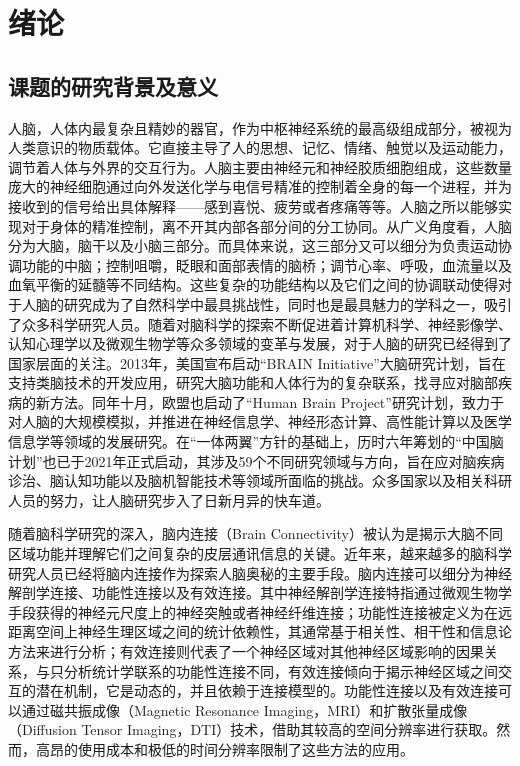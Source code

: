 
\chapter{绪论}
\section{课题的研究背景及意义}

人脑，人体内最复杂且精妙的器官，作为中枢神经系统的最高级组成部分，被视为人类意识的物质载体。它直接主导了人的思想、记忆、情绪、触觉以及运动能力，调节着人体与外界的交互行为\cite{1-1}。人脑主要由神经元和神经胶质细胞组成，这些数量庞大的神经细胞通过向外发送化学与电信号精准的控制着全身的每一个进程，并为接收到的信号给出具体解释——感到喜悦、疲劳或者疼痛等等\cite{1-2}。人脑之所以能够实现对于身体的精准控制，离不开其内部各部分间的分工协同。从广义角度看，人脑分为大脑，脑干以及小脑三部分。而具体来说，这三部分又可以细分为负责运动协调功能的中脑；控制咀嚼，眨眼和面部表情的脑桥；调节心率、呼吸，血流量以及血氧平衡的延髓等不同结构。这些复杂的功能结构以及它们之间的协调联动使得对于人脑的研究成为了自然科学中最具挑战性，同时也是最具魅力的学科之一，吸引了众多科学研究人员。随着对脑科学的探索不断促进着计算机科学、神经影像学、认知心理学以及微观生物学等众多领域的变革与发展，对于人脑的研究已经得到了国家层面的关注。2013年，美国宣布启动“BRAIN Initiative”大脑研究计划，旨在支持类脑技术的开发应用，研究大脑功能和人体行为的复杂联系，找寻应对脑部疾病的新方法。同年十月，欧盟也启动了“Human Brain Project”研究计划，致力于对人脑的大规模模拟，并推进在神经信息学、神经形态计算、高性能计算以及医学信息学等领域的发展研究。在“一体两翼”方针的基础上，历时六年筹划的“中国脑计划”也已于2021年正式启动，其涉及59个不同研究领域与方向，旨在应对脑疾病诊治、脑认知功能以及脑机智能技术等领域所面临的挑战。众多国家以及相关科研人员的努力，让人脑研究步入了日新月异的快车道。

随着脑科学研究的深入，脑内连接（Brain Connectivity）被认为是揭示大脑不同区域功能并理解它们之间复杂的皮层通讯信息的关键\cite{1-3,1-4,1-5}。近年来，越来越多的脑科学研究人员已经将脑内连接作为探索人脑奥秘的主要手段。脑内连接可以细分为神经解剖学连接、功能性连接以及有效连接。其中神经解剖学连接特指通过微观生物学手段获得的神经元尺度上的神经突触或者神经纤维连接\cite{1-3}；功能性连接被定义为在远距离空间上神经生理区域之间的统计依赖性\cite{1-10}，其通常基于相关性、相干性和信息论方法来进行分析\cite{1-11,1-12,1-8}；有效连接则代表了一个神经区域对其他神经区域影响的因果关系，与只分析统计学联系的功能性连接不同，有效连接倾向于揭示神经区域之间交互的潜在机制\cite{1-14}，它是动态的，并且依赖于连接模型的\cite{1-15}。功能性连接以及有效连接可以通过磁共振成像（Magnetic Resonance Imaging，MRI）和扩散张量成像（Diffusion Tensor Imaging，DTI）技术，借助其较高的空间分辨率进行获取\cite{1-6,1-7}。然而，高昂的使用成本和极低的时间分辨率限制了这些方法的应用。

